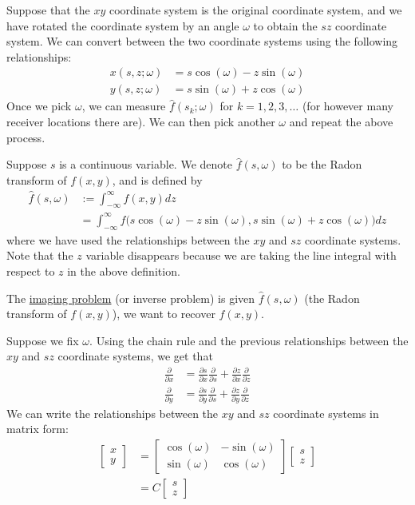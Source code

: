 
Suppose that the $xy$ coordinate system is the original coordinate system, and we have rotated the coordinate system by an angle $\omega$ to obtain the $sz$ coordinate system.
We can convert between the two coordinate systems using the following relationships:
\begin{align*}
	x(s, z; \omega) & = s \cos (\omega) - z \sin (\omega) \\
	y(s, z; \omega) & = s \sin(\omega) + z \cos (\omega)
\end{align*}
Once we pick $\omega$, we can measure $\hat{f}(s_{k}; \omega)$ for $k = 1, 2, 3, \hdots$ (for however many receiver locations there are).
We can then pick another $\omega$ and repeat the above process. 
\par 
Suppose $s$ is a continuous variable.
We denote $\hat{f}(s, \omega)$ to be the Radon transform of $f(x, y)$, and is defined by
\begin{align*}
	\hat{f}(s, \omega) & := \int_{-\infty}^{\infty} f(x, y) dz \\
					   & = \int_{-\infty}^{\infty} f\big( s \cos (\omega) - z \sin (\omega), s \sin(\omega) + z \cos (\omega) \big) dz
\end{align*}
where we have used the relationships between the $xy$ and $sz$ coordinate systems.
Note that the $z$ variable disappears because we are taking the line integral with respect to $z$ in the above definition. 
\par 
The \underline{imaging problem} (or inverse problem) is given $\hat{f}(s, \omega)$ (the Radon transform of $f(x, y)$), we want to recover $f(x, y)$.
\par 
Suppose we fix $\omega$.
Using the chain rule and the previous relationships between the $xy$ and $sz$ coordinate systems, we get that
\begin{align*}
	\frac{\partial}{\partial x} & = \frac{\partial s}{\partial x} \frac{\partial}{\partial s} + \frac{\partial z}{\partial x} \frac{\partial}{\partial z} \\
	\frac{\partial}{\partial y} & = \frac{\partial s}{\partial y} \frac{\partial}{\partial s} + \frac{\partial z}{\partial y} \frac{\partial}{\partial z}
\end{align*}
We can write the relationships between the $xy$ and $sz$ coordinate systems in matrix form:
\begin{align*}
	\begin{bmatrix}
		x \\
		y
	\end{bmatrix}
	& = 
	\begin{bmatrix}
		\cos (\omega) & - \sin (\omega) \\
		\sin (\omega) & \cos (\omega)
	\end{bmatrix}
	\begin{bmatrix}
		s \\
		z
	\end{bmatrix} \\
	& = C 
	\begin{bmatrix}
	s \\
	z
	\end{bmatrix}
\end{align*}
